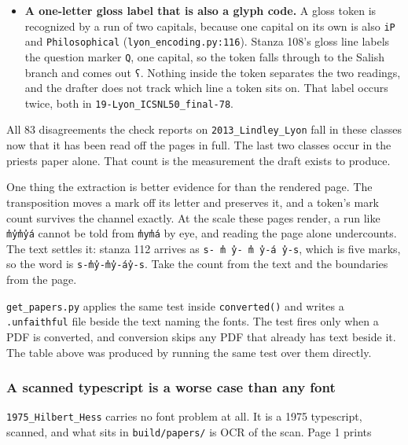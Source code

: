 \begin{itemize}
\item \textbf{A one-letter gloss label that is also a glyph code.} A gloss token is recognized by a run of two capitals, because one capital on its own is also \texttt{i\allowbreak{}P} and \texttt{Philosophical} (\texttt{lyon\_\allowbreak{}encoding.\allowbreak{}py:116}). Stanza 108's gloss line labels the question marker \texttt{Q}, one capital, so the token falls through to the Salish branch and comes out \texttt{ʕ}. Nothing inside the token separates the two readings, and the drafter does not track which line a token sits on. That label occurs twice, both in \texttt{19-\allowbreak{}Lyon\_\allowbreak{}ICSNL50\_\allowbreak{}final-\allowbreak{}78}.
\end{itemize}

All 83 disagreements the check reports on \texttt{2013\_\allowbreak{}Lindley\_\allowbreak{}Lyon} fall in these classes now that it has been read off the pages in full. The last two classes occur in the priests paper alone. That count is the measurement the draft exists to produce.

One thing the extraction is better evidence for than the rendered page. The transposition moves a mark off its letter and preserves it, and a token's mark count survives the channel exactly. At the scale these pages render, a run like \texttt{m̓y̓m̓y̓á} cannot be told from \texttt{m̓ym̓á} by eye, and reading the page alone undercounts. The text settles it: stanza 112 arrives as \texttt{s-\allowbreak{} m̓ y̓-\allowbreak{} m̓ y̓-\allowbreak{}á y̓-\allowbreak{}s}, which is five marks, so the word is \texttt{s-\allowbreak{}m̓y̓-\allowbreak{}m̓y̓-\allowbreak{}áy̓-\allowbreak{}s}. Take the count from the text and the boundaries from the page.

\texttt{get\_\allowbreak{}papers.\allowbreak{}py} applies the same test inside \texttt{converted()} and writes a \texttt{.\allowbreak{}unfaithful} file beside the text naming the fonts. The test fires only when a PDF is converted, and conversion skips any PDF that already has text beside it. The table above was produced by running the same test over them directly.

\subsubsection{A scanned typescript is a worse case than any font}

\texttt{1975\_\allowbreak{}Hilbert\_\allowbreak{}Hess} carries no font problem at all. It is a 1975 typescript, scanned, and what sits in \texttt{build/\allowbreak{}papers/\allowbreak{}} is OCR of the scan. Page 1 prints

